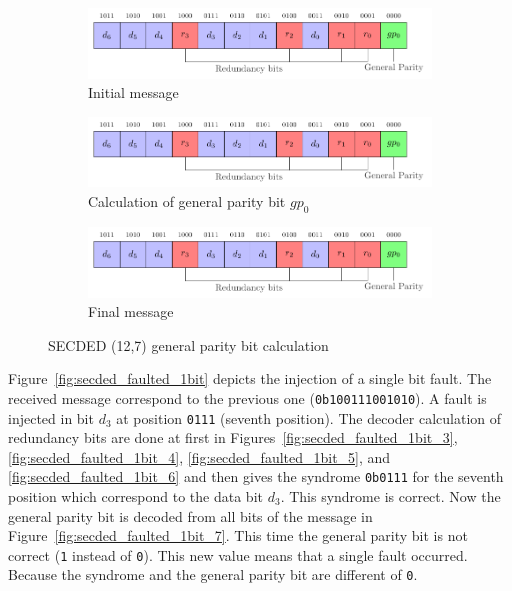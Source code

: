 \begin{figure}[ht]
    \centering
    \begin{subfigure}[b]{0.49\textwidth}
        \includegraphics[width=\textwidth, page=2]{c5_countermeasures_dift/img/secded.pdf}
        \caption{Initial message}
        \label{fig:secded_example_1}
    \end{subfigure}
    \hfill
    \begin{subfigure}[b]{0.49\textwidth}
        \includegraphics[width=\textwidth, page=4]{c5_countermeasures_dift/img/secded.pdf}
        \caption{Calculation of general parity bit $gp_0$}
        \label{fig:secded_example_2}
    \end{subfigure}
    \hfill
    \begin{subfigure}[b]{0.49\textwidth}
        \includegraphics[width=\textwidth, page=5]{c5_countermeasures_dift/img/secded.pdf}
        \caption{Final message}
        \label{fig:secded_example_3}
    \end{subfigure}
    \caption{SECDED (12,7) general parity bit calculation}
    \label{fig:secded_example}
\end{figure}

Figure~\ref{fig:secded_faulted_1bit} depicts the injection of a single bit fault. The received message correspond to the previous one (\texttt{0b100111001010}). A fault is injected in bit $d_3$ at position \texttt{0111} (seventh position).
The decoder calculation of redundancy bits are done at first in Figures~\ref{fig:secded_faulted_1bit_3}, \ref{fig:secded_faulted_1bit_4}, \ref{fig:secded_faulted_1bit_5}, and \ref{fig:secded_faulted_1bit_6} and then gives the syndrome \texttt{0b0111} for the seventh position which correspond to the data bit $d_3$. This syndrome is correct. Now the general parity bit is decoded from all bits of the message in Figure~\ref{fig:secded_faulted_1bit_7}. This time the general parity bit is not correct (\texttt{1} instead of \texttt{0}). This new value means that a single fault occurred. Because the syndrome and the general parity bit are different of \texttt{0}.

